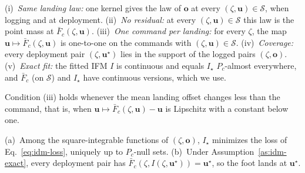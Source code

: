\begin{assumption}
\label{as:idm-exact}
(i)~\emph{Same landing law:} one kernel gives the law of $\mathbf o$ at
every $(\zeta,\mathbf u) \in \mathcal S$, when logging and at deployment.
(ii)~\emph{No residual:} at every $(\zeta,\mathbf u) \in \mathcal S$ this
law is the point mass at $\bar F_c(\zeta,\mathbf u)$.
(iii)~\emph{One command per landing:} for every $\zeta$, the map $\mathbf
u \mapsto \bar F_c(\zeta,\mathbf u)$ is one-to-one on the commands with
$(\zeta,\mathbf u) \in \mathcal S$.
(iv)~\emph{Coverage:} every deployment pair $(\zeta,\mathbf u^\star)$ lies
in the support of the logged pairs $(\zeta,\mathbf o)$.
(v)~\emph{Exact fit:} the fitted IFM $I$ is continuous and equals
$I_\star$ $P_c$-almost everywhere, and $\bar F_c$ (on $\mathcal S$) and
$I_\star$ have continuous versions, which we use.
\end{assumption}

Condition (iii) holds whenever the mean landing offset changes less than
the command, that is, when $\mathbf u \mapsto \bar F_c(\zeta,\mathbf u) -
\mathbf u$ is Lipschitz with a constant below one.

\begin{proposition}
\label{prop:idm-mean}
(a)~Among the square-integrable functions of $(\zeta,\mathbf o)$,
$I_\star$ minimizes the loss of Eq.~\eqref{eq:idm-loss}, uniquely up to
$P_c$-null sets.
(b)~Under Assumption~\ref{as:idm-exact}, every deployment pair has $\bar
F_c(\zeta, I(\zeta,\mathbf u^\star)) = \mathbf u^\star$, so the foot lands
at $\mathbf u^\star$.
\end{proposition}

